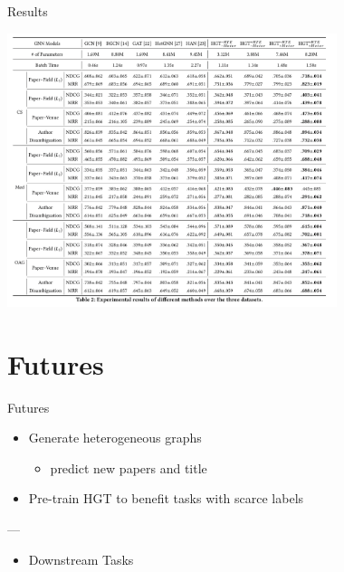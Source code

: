 \documentclass[aspectratio=1610,hyperref={colorlinks,unicode,linkcolor=blue,anchorcolor=blue,citecolor=blue,filecolor=black,urlcolor=blue}]{beamer}
\begin{document}
\begin{frame}[label={sec:org36febc0}]{Results}
\begin{center}
\includegraphics[height=8cm]{./p10.png}
\end{center}
\end{frame}

\section{Futures}
\label{sec:orga0fc50f}

\begin{frame}[label={sec:org7ffbf3a}]{Futures}
\begin{itemize}
\item Generate heterogeneous graphs
\begin{itemize}
\item predict new papers and title
\end{itemize}
\item Pre-train HGT to benefit tasks with scarce labels
\end{itemize}

---

\begin{itemize}
\item Downstream Tasks
\end{itemize}
\end{frame}
\end{document}
